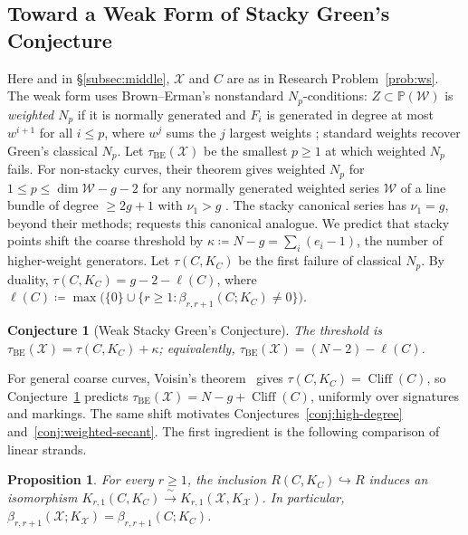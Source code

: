 \documentclass[11pt,reqno]{amsart}
\newtheorem{prop}[lemma]{Proposition}
\newtheorem{conjecture}[lemma]{Conjecture}
\theoremstyle{remark}
\newcommand{\cliff}{\operatorname{Cliff}}
\newcommand{\BE}{\operatorname{BE}}
\newcommand{\PP}{\mathbb{P}}
\newcommand{\cW}{\mathcal{W}}
\newcommand{\cX}{\mathcal{X}}
\begin{document}
\subsection{Toward a Weak Form of Stacky Green's Conjecture}\label{subsec:stacky-green}

Here and in \S\ref{subsec:middle}, $\cX$ and $C$ are as in Research Problem~\ref{prob:ws}. The weak form uses Brown--Erman's nonstandard $N_p$-conditions: $Z\subset\PP(\cW)$ is \emph{weighted $N_p$} if it is normally generated and $F_i$ is generated in degree at most $w^{i+1}$ for all $i\leq p$, where $w^j$ sums the $j$ largest weights \cite[Def.~1.2]{brownErman25}; standard weights recover Green's classical $N_p$. Let $\tau_{\BE}(\cX)$ be the smallest $p\geq1$ at which weighted $N_p$ fails. For non-stacky curves, their theorem gives weighted $N_p$ for $1\leq p\leq\dim\cW-g-2$ for any normally generated weighted series $\cW$ of a line bundle of degree $\ge2g+1$ with $\nu_1>g$ \cite[Thm.~1.7]{brownErman25}. The stacky canonical series has $\nu_1=g$, beyond their methods; \cite[Ques.~7.7]{brownErman25} requests this canonical analogue. We predict that stacky points shift the coarse threshold by $\kappa\coloneqq N-g=\sum_i(e_i-1)$, the number of higher-weight generators. Let $\tau(C,K_C)$ be the first failure of classical $N_p$. By duality, $\tau(C,K_C)=g-2-\ell(C)$, where $\ell(C)\coloneqq\max\bigl(\{0\}\cup \{r\ge1:\beta_{r,r+1}(C;K_C)\ne0\}\bigr)$.

\begin{conjecture}[Weak Stacky Green's Conjecture]\label{con:WSGC}
The threshold is $\tau_{\BE}(\cX)=\tau(C,K_C)+\kappa$; equivalently, $\tau_{\BE}(\cX)=(N-2)-\ell(C)$.
\end{conjecture}

For general coarse curves, Voisin's theorem~\cite{voisin02,voisin05} gives $\tau(C,K_C)=\cliff(C)$, so Conjecture~\ref{con:WSGC} predicts $\tau_{\BE}(\cX)=N-g+\cliff(C)$, uniformly over signatures and markings. The same shift motivates Conjectures~\ref{conj:high-degree} and~\ref{conj:weighted-secant}. The first ingredient is the following comparison of linear strands.

\begin{prop}\label{prop:linear-strand}
For every $r\geq1$, the inclusion $R(C,K_C)\hookrightarrow R$ induces an isomorphism $K_{r,1}(C,K_C)\xrightarrow{\ \sim\ }K_{r,1}(\cX,K_{\cX})$.
In particular, $\beta_{r,r+1}(\cX;K_{\cX})=\beta_{r,r+1}(C;K_C)$.
\end{prop}
\end{document}
